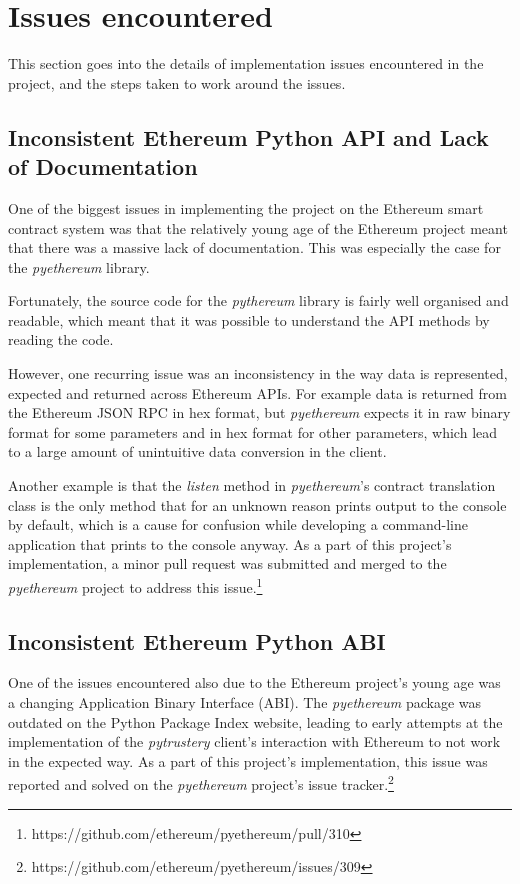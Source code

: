 \documentclass[12pt,a4paper]{report}
\begin{document}
	\section{Issues encountered}
	This section goes into the details of implementation issues encountered in the project, and the steps taken to work around the issues.
	
	\subsection{Inconsistent Ethereum Python API and Lack of Documentation}
	One of the biggest issues in implementing the project on the Ethereum smart contract system was that the relatively young age of the Ethereum project meant that there was a massive lack of documentation. This was especially the case for the \textit{pyethereum} library.
	
	Fortunately, the source code for the \textit{pythereum} library is fairly well organised and readable, which meant that it was possible to understand the API methods by reading the code.
	
	However, one recurring issue was an inconsistency in the way data is represented, expected and returned across Ethereum APIs. For example data is returned from the Ethereum JSON RPC in hex format, but \textit{pyethereum} expects it in raw binary format for some parameters and in hex format for other parameters, which lead to a large amount of unintuitive data conversion in the client.
	
	Another example is that the \textit{listen} method in \textit{pyethereum}'s contract translation class is the only method that for an unknown reason prints output to the console by default, which is a cause for confusion while developing a command-line application that prints to the console anyway. As a part of this project's implementation, a minor pull request was submitted and merged to the \textit{pyethereum} project to address this issue.\footnote{https://github.com/ethereum/pyethereum/pull/310}
	
	\subsection{Inconsistent Ethereum Python ABI}
	One of the issues encountered also due to the Ethereum project's young age was a changing Application Binary Interface (ABI). The \textit{pyethereum} package was outdated on the Python Package Index website, leading to early attempts at the implementation of the \textit{pytrustery} client's interaction with Ethereum to not work in the expected way. As a part of this project's implementation, this issue was reported and solved on the \textit{pyethereum} project's issue tracker.\footnote{https://github.com/ethereum/pyethereum/issues/309}
	
\end{document}

